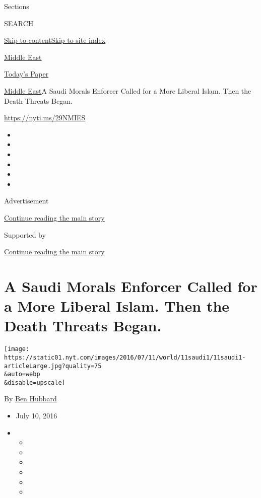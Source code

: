 Sections

SEARCH

\protect\hyperlink{site-content}{Skip to
content}\protect\hyperlink{site-index}{Skip to site index}

\href{https://www.nytimes.com/section/world/middleeast}{Middle East}

\href{https://myaccount.nytimes.com/auth/login?response_type=cookie\&client_id=vi}{}

\href{https://www.nytimes.com/section/todayspaper}{Today's Paper}

\href{/section/world/middleeast}{Middle East}\textbar{}A Saudi Morals
Enforcer Called for a More Liberal Islam. Then the Death Threats Began.

\url{https://nyti.ms/29NMIES}

\begin{itemize}
\item
\item
\item
\item
\item
\item
\end{itemize}

Advertisement

\protect\hyperlink{after-top}{Continue reading the main story}

Supported by

\protect\hyperlink{after-sponsor}{Continue reading the main story}

\hypertarget{a-saudi-morals-enforcer-called-for-a-more-liberal-islam-then-the-death-threats-began}{%
\section{A Saudi Morals Enforcer Called for a More Liberal Islam. Then
the Death Threats
Began.}\label{a-saudi-morals-enforcer-called-for-a-more-liberal-islam-then-the-death-threats-began}}

\texttt{[image: https://static01.nyt.com/images/2016/07/11/world/11saudi1/11saudi1-articleLarge.jpg?quality=75\\\&auto=webp\\\&disable=upscale]}

By \href{http://www.nytimes.com/by/ben-hubbard}{Ben Hubbard}

\begin{itemize}
\item
  July 10, 2016
\item
  \begin{itemize}
  \item
  \item
  \item
  \item
  \item
  \item
  \end{itemize}
\end{itemize}


